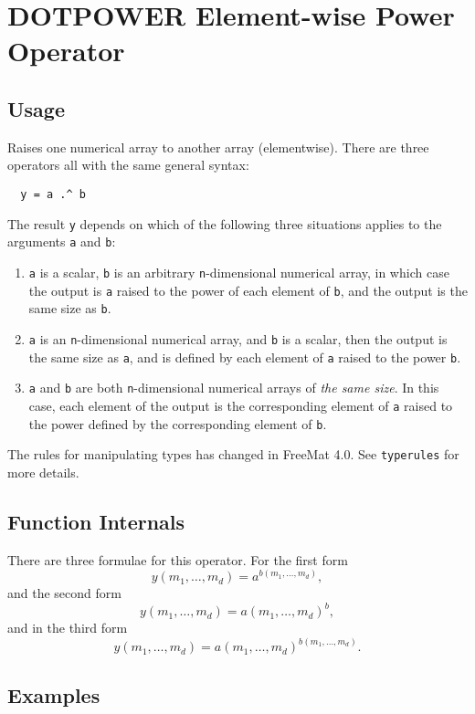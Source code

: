 \section{DOTPOWER Element-wise Power Operator}

\subsection{Usage}

Raises one numerical array to another array (elementwise).  There are three operators all with the same general syntax:
\begin{verbatim}
  y = a .^ b
\end{verbatim}
The result \verb|y| depends on which of the following three situations applies to the arguments \verb|a| and \verb|b|:
\begin{enumerate}
\item  \verb|a| is a scalar, \verb|b| is an arbitrary \verb|n|-dimensional numerical array, in which case the output is \verb|a| raised to the power of each element of \verb|b|, and the output is the same size as \verb|b|.

\item  \verb|a| is an \verb|n|-dimensional numerical array, and \verb|b| is a scalar, then the output is the same size as \verb|a|, and is defined by each element of \verb|a| raised to the power \verb|b|.

\item  \verb|a| and \verb|b| are both \verb|n|-dimensional numerical arrays of \emph{the same size}.  In this case, each element of the output is the corresponding element of \verb|a| raised to the power defined by the corresponding element of \verb|b|.

\end{enumerate}

The rules for manipulating types has changed in FreeMat 4.0.  See \verb|typerules|
for more details.

\subsection{Function Internals}

There are three formulae for this operator.  For the first form
\[
y(m_1,\ldots,m_d) = a^{b(m_1,\ldots,m_d)},
\]
and the second form
\[
y(m_1,\ldots,m_d) = a(m_1,\ldots,m_d)^b,
\]
and in the third form
\[
y(m_1,\ldots,m_d) = a(m_1,\ldots,m_d)^{b(m_1,\ldots,m_d)}.
\]
\subsection{Examples}

